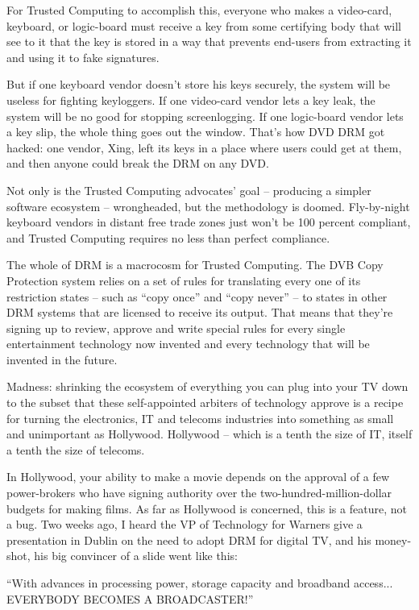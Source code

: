 For Trusted Computing to accomplish this, everyone who makes a
video-card, keyboard, or logic-board must receive a key from some
certifying body that will see to it that the key is stored in a way
that prevents end-users from extracting it and using it to fake
signatures.

But if one keyboard vendor doesn't store his keys securely, the
system will be useless for fighting keyloggers. If one video-card
vendor lets a key leak, the system will be no good for stopping
screenlogging. If one logic-board vendor lets a key slip, the whole
thing goes out the window. That's how DVD DRM got hacked: one
vendor, Xing, left its keys in a place where users could get at
them, and then anyone could break the DRM on any DVD.

Not only is the Trusted Computing advocates' goal -- producing a
simpler software ecosystem -- wrongheaded, but the methodology is
doomed. Fly-by-night keyboard vendors in distant free trade zones
just won't be 100 percent compliant, and Trusted Computing requires
no less than perfect compliance.

The whole of DRM is a macrocosm for Trusted Computing. The DVB Copy
Protection system relies on a set of rules for translating every
one of its restriction states -- such as ``copy once'' and ``copy
never'' -- to states in other DRM systems that are licensed to
receive its output. That means that they're signing up to review,
approve and write special rules for every single entertainment
technology now invented and every technology that will be invented
in the future.

Madness: shrinking the ecosystem of everything you can plug into
your TV down to the subset that these self-appointed arbiters of
technology approve is a recipe for turning the electronics, IT and
telecoms industries into something as small and unimportant as
Hollywood. Hollywood -- which is a tenth the size of IT, itself a
tenth the size of telecoms.

In Hollywood, your ability to make a movie depends on the approval
of a few power-brokers who have signing authority over the
two-hundred-million-dollar budgets for making films. As far as
Hollywood is concerned, this is a feature, not a bug. Two weeks
ago, I heard the VP of Technology for Warners give a presentation
in Dublin on the need to adopt DRM for digital TV, and his
money-shot, his big convincer of a slide went like this:

``With advances in processing power, storage capacity and broadband
access... EVERYBODY BECOMES A BROADCASTER!''

